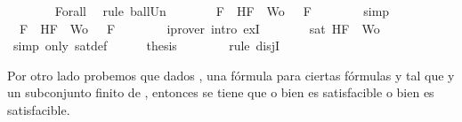 \begin{isabellebody}
\ \ \ \ \ \ \isamarkupfalse%
\ Forall{}\ \isamarkupfalse%
\ {\isacharparenleft}rule\ ball{\isacharunderscore}Un{\isacharparenright}\isanewline
\ \ \ \ \isamarkupfalse%
\ \isamarkupfalse%
\ {\isachardoublequoteopen}{\isasymforall}F\ {\isasymin}\ {\isacharbraceleft}H{\isacharcomma}F{\isacharbraceright}\ {\isasymunion}\ Wo{\isachardot}\ {\isasymA}\ {\isasymTurnstile}\ F{\isachardoublequoteclose}\isanewline
\ \ \ \ \ \ \isamarkupfalse%
\ simp\isanewline
\ \ \ \ \isamarkupfalse%
\ \isamarkupfalse%
\ {\isachardoublequoteopen}{\isasymexists}{\isasymA}{\isachardot}\ {\isasymforall}F\ {\isasymin}\ {\isacharparenleft}{\isacharbraceleft}H{\isacharcomma}F{\isacharbraceright}\ {\isasymunion}\ Wo{\isacharparenright}{\isachardot}\ {\isasymA}\ {\isasymTurnstile}\ F{\isachardoublequoteclose}\isanewline
\ \ \ \ \ \ \isamarkupfalse%
\ {\isacharparenleft}iprover\ intro{\isacharcolon}\ exI{\isacharparenright}\isanewline
\ \ \ \ \isamarkupfalse%
\ \isamarkupfalse%
\ {\isachardoublequoteopen}sat\ {\isacharparenleft}{\isacharbraceleft}H{\isacharcomma}F{\isacharbraceright}\ {\isasymunion}\ Wo{\isacharparenright}{\isachardoublequoteclose}\isanewline
\ \ \ \ \ \ \isamarkupfalse%
\ {\isacharparenleft}simp\ only{\isacharcolon}\ sat{\isacharunderscore}def{\isacharparenright}\isanewline
\ \ \ \ \isamarkupfalse%
\ {\isacharquery}thesis\isanewline
\ \ \ \ \ \ \isamarkupfalse%
\ {\isacharparenleft}rule\ disjI{}{\isacharparenright}\isanewline
\ \ \isamarkupfalse%
\isanewline
{}\isamarkupfalse%
%
\endisatagproof
{\isafoldproof}%
%
\isadelimproof
%
\endisadelimproof
%
\begin{isamarkuptext}%
Por otro lado probemos que dados , una fórmula  para ciertas fórmulas 
   y  tal que  y  un subconjunto finito de , entonces se tiene que o bien 
   es satisfacible o bien  es satisfacible.%
\end{isamarkuptext}\isamarkuptrue%
\isamarkupfalse%

\end{isabellebody}
